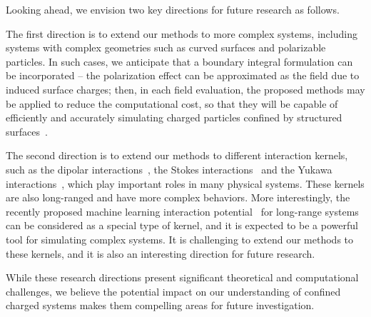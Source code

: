 Looking ahead, we envision two key directions for future research as follows.

The first direction is to extend our methods to more complex systems, including systems with complex geometries such as curved surfaces and polarizable particles.
In such cases, we anticipate that a boundary integral formulation can be incorporated -- the polarization effect can be approximated as the field due to induced surface charges; then, in each field evaluation, the proposed methods may be applied to reduce the computational cost, so that they will be capable of efficiently and accurately simulating charged particles confined by structured surfaces~\cite{wu2018asymmetric}.

The second direction is to extend our methods to different interaction kernels, such as the dipolar interactions~\cite{Messina2017PRL}, the Stokes interactions~\cite{barnett2018unified} and the Yukawa interactions~\cite{Hou2009PRL}, which play important roles in many physical systems.
These kernels are also long-ranged and have more complex behaviors.
More interestingly, the recently proposed machine learning interaction potential~\cite{cheng2025latent, ji2025machinelearninginteratomicpotentialslongrange} for long-range systems can be considered as a special type of kernel, and it is expected to be a powerful tool for simulating complex systems.
It is challenging to extend our methods to these kernels, and it is also an interesting direction for future research.

While these research directions present significant theoretical and computational challenges, we believe the potential impact on our understanding of confined charged systems makes them compelling areas for future investigation.